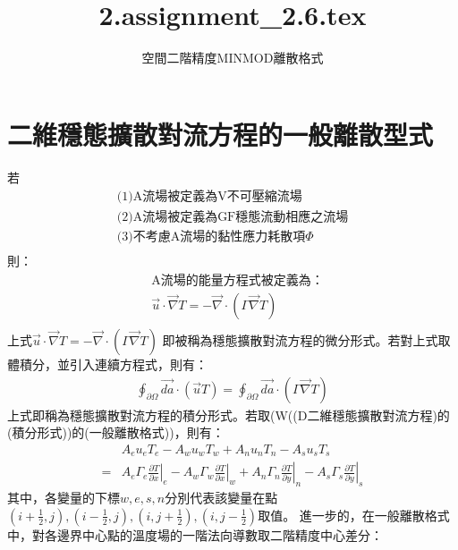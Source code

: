 \documentclass[12pt]{article}
\title{2.assignment\_2.6.tex}
\author{空間二階精度MINMOD離散格式}
\begin{document}
\maketitle
\section{二維穩態擴散對流方程的一般離散型式}
\noindent 若
\[
\begin{array}{l}
    \text{(1)A流場被定義為V不可壓縮流場}\\[1.5ex]
    \text{(2)A流場被定義為GF穩態流動相應之流場}\\[1.5ex]
    \text{(3)不考慮A流場的黏性應力耗散項$\Phi$}\\[1.5ex]
\end{array}
\]
則：
\begin{equation}\begin{split}
    &\text{A流場的能量方程式被定義為：}\\[1.5ex]
    &\vec{u}\cdot \vec{\nabla}T = -\vec{\nabla} \cdot (\Gamma \vec{\nabla}T) \\[1.5ex]
\end{split}\end{equation}
\noindent 上式$\vec{u}\cdot \vec{\nabla}T = -\vec{\nabla} \cdot (\Gamma \vec{\nabla}T)$
即被稱為穩態擴散對流方程的微分形式。若對上式取體積分，並引入連續方程式，則有：
\begin{equation}\begin{split}
    \oint_{\partial \Omega} \vec{da}\cdot (\vec{u}T) = \oint_{\partial \Omega} \vec{da}\cdot (\Gamma \vec{\nabla }T)
\end{split}\end{equation}
\noindent 上式即稱為穩態擴散對流方程的積分形式。若取(W((D二維穩態擴散對流方程)的(積分形式))的(一般離散格式))，則有：
\begin{equation}\begin{split}
    &A_{e}u_{e}T_{e} - A_{w}u_{w}T_{w}+A_{n}u_{n}T_{n} - A_{s}u_{s}T_{s} \\[1.5ex]
    =& A_{e}\Gamma_{e}\left.\frac{\partial T}{\partial x}\right|_{e}-A_{w}\Gamma_{w}\left.\frac{\partial T}{\partial x}\right|_{w}+A_{n}\Gamma_{n}\left.\frac{\partial T}{\partial y}\right|_{n}-A_{s}\Gamma_{s}\left.\frac{\partial T}{\partial y}\right|_{s}
\end{split}\end{equation}
\noindent 其中，各變量的下標$w,e,s,n$分別代表該變量在點$(i+\frac{1}{2},j),(i-\frac{1}{2},j),(i,j+\frac{1}{2}),(i,j-\frac{1}{2})$取值。
\noindent 進一步的，在一般離散格式中，對各邊界中心點的溫度場的一階法向導數取二階精度中心差分：
\end{document}
